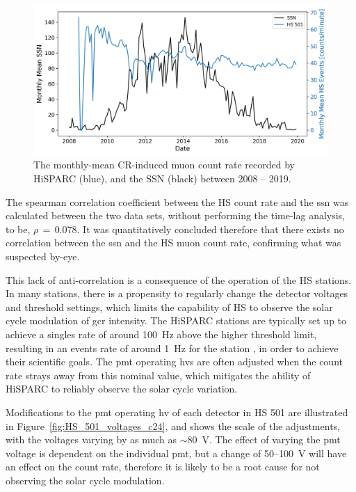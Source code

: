 \begin{figure}[ht!]
	\includegraphics[width=\columnwidth]{HS_501_vs_SSN_c24_copy2.png}
	\caption{The monthly-mean CR-induced muon count rate recorded by HiSPARC (blue), and the SSN (black) between 2008 -- 2019.}
	\label{fig:HS_SSN_timeseries}
\end{figure}

The spearman correlation coefficient between the HS count rate and the \gls{ssn} was calculated between the two data sets, without performing the time-lag analysis, to be, $\rho\,=\,0.078$. It was quantitatively concluded therefore that there exists no correlation between the \gls{ssn} and the HS muon count rate, confirming what was suspected by-eye.

This lack of anti-correlation is a consequence of the operation of the HS stations. In many stations, there is a propensity to regularly change the detector voltages and threshold settings, which limits the capability of HS to observe the solar cycle modulation of \gls{gcr} intensity. The HiSPARC stations are typically set up to achieve a singles rate of around 100~Hz above the higher threshold limit, resulting in an events rate of around 1~Hz for the station \citep{fokkema_hisparc_2012}, in order to achieve their scientific goals. The \gls{pmt} operating \glspl{hv} are often adjusted when the count rate strays away from this nominal value, which mitigates the ability of HiSPARC to reliably observe the solar cycle variation. 

Modifications to the \gls{pmt} operating \gls{hv} of each detector in HS 501 are illustrated in Figure~\ref{fig:HS_501_voltages_c24}, and shows the scale of the adjustments, with the voltages varying by as much as $\sim 80$~V. The effect of varying the \gls{pmt} voltage is dependent on the individual \gls{pmt}, but a change of 50--100~V will have an effect on the count rate, therefore it is likely to be a root cause for not observing the solar cycle modulation.

